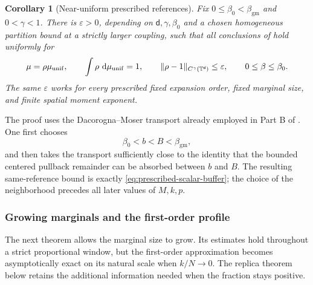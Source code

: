 \documentclass[11pt,reqno]{amsart}
\numberwithin{equation}{section}
\theoremstyle{plain}
\newtheorem{cor}[cor]{Corollary}
\theoremstyle{definition}
\DeclarePairedDelimiter{\norm}{\lVert}{\rVert}
\renewcommand{\d}{\mathsf d}
\newcommand{\dd}{\mathop{}\!\mathrm d}
\newcommand{\T}{\mathbb T}
\newcommand{\be}{\beta}
\newcommand{\vep}{\varepsilon}
\newcommand{\muunif}{\mu_{\mathrm{unif}}}
\newcommand{\gm}{\mathrm{gm}}
\begin{document}
\begin{cor}[Near-uniform prescribed references]
\label{cor:prescribed-near-uniform}
Fix $0\leq\be_0<\beta_{\gm}$ and $0<\gamma<1$.  There is $\vep>0$, depending on $\d,\gamma,\be_0$ and a chosen homogeneous partition bound at a strictly larger coupling, such that all conclusions of  hold uniformly for
\begin{equation}
 \mu=\rho\muunif,
 \qquad
 \int\rho\,\dd\muunif=1,
 \qquad
 \norm{\rho-1}_{C^\gamma(\T^\d)}\leq\vep,
 \qquad
 0\leq\be\leq\be_0.
 \label{eq:prescribed-near-uniform-class}
\end{equation}
The same $\vep$ works for every prescribed fixed expansion order, fixed marginal size, and finite spatial moment exponent.
\end{cor}

The proof uses the Dacorogna--Moser transport already employed in Part B of .  One first chooses
\begin{equation}
 \be_0<b<B<\beta_{\gm},
 \label{eq:prescribed-three-temperature-buffer}
\end{equation}
and then takes the transport sufficiently close to the identity that the bounded centered pullback remainder can be absorbed between $b$ and $B$.  The resulting same-reference bound is exactly \eqref{eq:prescribed-scalar-buffer}; the choice of the neighborhood precedes all later values of $M,k,p$.

\subsubsection{Growing marginals and the first-order profile}

The next theorem allows the marginal size to grow. Its estimates hold throughout a strict proportional window, but the first-order approximation becomes asymptotically exact on its natural scale when $k/N\to0$. The replica theorem below retains the additional information needed when the fraction stays positive.
\end{document}
